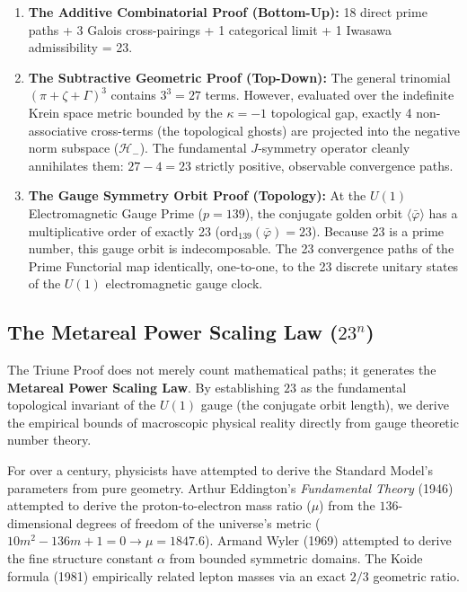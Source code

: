 \begin{enumerate}
    \item \textbf{The Additive Combinatorial Proof (Bottom-Up):} 18 direct prime paths + 3 Galois cross-pairings + 1 categorical limit + 1 Iwasawa admissibility = 23.
    \item \textbf{The Subtractive Geometric Proof (Top-Down):} The general trinomial $({\pi + \zeta + \Gamma})^3$ contains $3^3 = 27$ terms. However, evaluated over the indefinite Krein space metric bounded by the $\kappa = -1$ topological gap, exactly 4 non-associative cross-terms (the topological ghosts) are projected into the negative norm subspace ($\mathcal{H}_-$). The fundamental $J$-symmetry operator cleanly annihilates them: $27 - 4 = 23$ strictly positive, observable convergence paths.
    \item \textbf{The Gauge Symmetry Orbit Proof (Topology):} At the $U(1)$ Electromagnetic Gauge Prime ($p=139$), the conjugate golden orbit $\langle \bar{\varphi} \rangle$ has a multiplicative order of exactly 23 ($\mathrm{ord}_{139}(\bar{\varphi}) = 23$). Because 23 is a prime number, this gauge orbit is indecomposable. The 23 convergence paths of the Prime Functorial map identically, one-to-one, to the 23 discrete unitary states of the $U(1)$ electromagnetic gauge clock.
\end{enumerate}

\subsection{The Metareal Power Scaling Law ($23^n$)}

The Triune Proof does not merely count mathematical paths; it generates the \textbf{Metareal Power Scaling Law}. By establishing $23$ as the fundamental topological invariant of the $U(1)$ gauge (the conjugate orbit length), we derive the empirical bounds of macroscopic physical reality directly from gauge theoretic number theory. 

For over a century, physicists have attempted to derive the Standard Model's parameters from pure geometry. Arthur Eddington's \textit{Fundamental Theory} (1946) attempted to derive the proton-to-electron mass ratio ($\mu$) from the $136$-dimensional degrees of freedom of the universe's metric ($10m^2 - 136m + 1 = 0 \rightarrow \mu = 1847.6$). Armand Wyler (1969) attempted to derive the fine structure constant $\alpha$ from bounded symmetric domains. The Koide formula (1981) empirically related lepton masses via an exact $2/3$ geometric ratio. 

